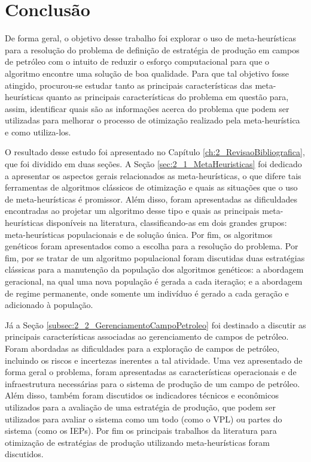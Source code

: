 
\chapter{Conclusão}
\label{ch:6_Conclusao}
De forma geral, o objetivo desse trabalho foi explorar o uso de meta-heurísticas para a resolução do problema de definição de estratégia de produção em campos de petróleo com o intuito de reduzir o esforço computacional para que o algoritmo encontre uma solução de boa qualidade. Para que tal objetivo fosse atingido, procurou-se estudar tanto as principais características das meta-heurísticas quanto as principais características do problema em questão para, assim, identificar quais são as informações acerca do problema que podem ser utilizadas para melhorar o processo de otimização realizado pela meta-heurística e como utiliza-los.  

O resultado desse estudo foi apresentado no Capítulo \ref{ch:2_RevisaoBibliografica}, que foi dividido em duas seções. A Seção  \ref{sec:2_1_MetaHeuristicas} foi dedicado a apresentar os aspectos gerais relacionados as meta-heurísticas, o que difere tais ferramentas de algoritmos clássicos de otimização e quais as situações que o uso de meta-heurísticas é promissor. Além disso, foram apresentadas as dificuldades encontradas ao projetar um algoritmo desse tipo e quais as principais meta-heurísticas disponíveis na literatura, classificando-as em dois grandes grupos: meta-heurísticas populacionais e de solução única. Por fim, os algoritmos genéticos foram apresentados como a escolha para a resolução do problema. Por fim, por se tratar de um algoritmo populacional foram discutidas duas estratégias clássicas para a manutenção da população dos algoritmos genéticos: a abordagem geracional, na qual uma nova população é gerada a cada iteração; e a abordagem de regime permanente, onde somente um indivíduo é gerado a cada geração e adicionado à população. 

Já a Seção \ref{subsec:2_2_GerenciamentoCampoPetroleo} foi destinado a discutir as principais características associadas ao gerenciamento de campos de petróleo. Foram abordadas as dificuldades para a exploração de campos de petróleo, incluindo os riscos e incertezas inerentes a tal atividade. Uma vez apresentado de forma geral o problema, foram apresentadas as características operacionais e de infraestrutura necessárias para o sistema de produção de um campo de petróleo. Além disso, também foram discutidos os indicadores técnicos e econômicos utilizados para a avaliação de uma estratégia de produção, que podem ser utilizados para avaliar o sistema como um todo (como o VPL) ou partes do sistema (como os IEPs). Por fim os principais trabalhos da literatura para otimização de estratégias de produção utilizando meta-heurísticas foram discutidos.

